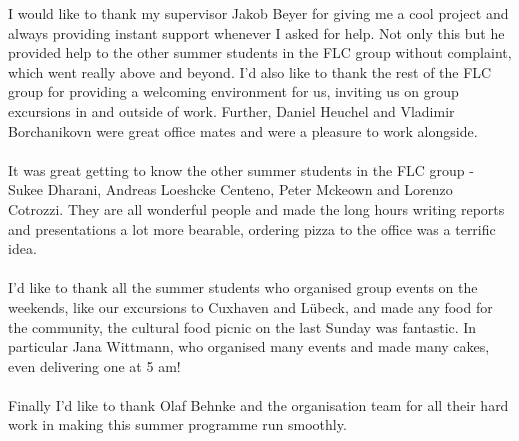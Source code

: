 I would like to thank my supervisor Jakob Beyer for giving me a cool project and always providing instant support whenever I asked for help. Not only this but he provided help to the other summer students in the FLC group without complaint, which went really above and beyond. I'd also like to thank the rest of the FLC group for providing a welcoming environment for us, inviting us on group excursions in and outside of work. Further, Daniel Heuchel and Vladimir Borchanikovn were great office mates and were a pleasure to work alongside.
\\\\
It was great getting to know the other summer students in the FLC group - Sukee Dharani, Andreas Loeshcke Centeno, Peter Mckeown and Lorenzo Cotrozzi. They are all wonderful people and made the long hours writing reports and presentations a lot more bearable, ordering pizza to the office was a terrific idea.
\\\\
I'd like to thank all the summer students who organised group events on the weekends, like our excursions to Cuxhaven and L\"ubeck, and made any food for the community, the cultural food picnic on the last Sunday was fantastic. In particular Jana Wittmann, who organised many events and made many cakes, even delivering one at 5 am!
\\\\
Finally I'd like to thank Olaf Behnke and the organisation team for all their hard work in making this summer programme run smoothly.
